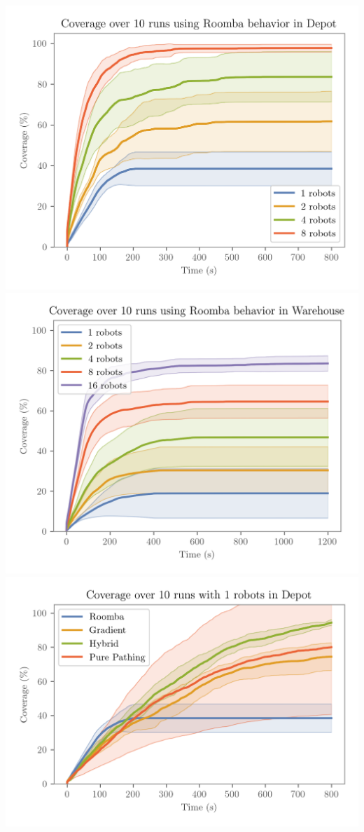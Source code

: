 \\
\includegraphics[width=\w]{figures/plots/benchmarks/coverage-over-10-runs-using-roomba-behavior-in-depot.png}
\hfill
\includegraphics[width=\w]{figures/plots/benchmarks/coverage-over-10-runs-using-roomba-behavior-in-warehouse.png}
\\
\includegraphics[width=\w]{figures/plots/benchmarks/coverage-over-10-runs-with-1-robots-in-depot.png}
